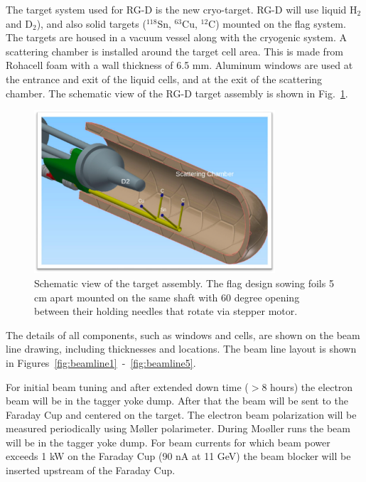 \documentclass[11pt]{article}
\begin{document}
The target system used for RG-D is the new cryo-target.  RG-D will use liquid H$_2$ and D$_2$), and also solid targets ($^{118}$Sn, $^{63}$Cu, $^{12}$C) mounted on the flag system. The targets are housed in a vacuum vessel along with the cryogenic system.  A scattering chamber is installed around the target cell area.  This is made from Rohacell foam with a wall thickness of 6.5 mm.  Aluminum windows are used at the entrance and exit of the liquid cells, and at the exit of the scattering chamber. The schematic view of the RG-D target assembly is shown in Fig.~\ref{fig:RGDT}. 

\begin{figure}[htb!]
\centering
\includegraphics[width=0.8\textwidth]{RGDtarget.png}
\caption{Schematic view of the target assembly.
The flag design sowing foils 5 cm apart mounted on the same shaft with 60 degree opening between their holding needles that rotate via stepper motor.}
\label{fig:RGDT}
\end{figure}


The details of all components, such as windows and cells, are shown on the beam line drawing, including thicknesses and locations.  The beam line layout is shown in Figures~\ref{fig:beamline1}~-~\ref{fig:beamline5}.



For initial beam tuning and after extended down time ($>$8 hours) the electron beam will be  in the tagger yoke dump. After that the beam will be sent to the Faraday Cup and centered on the target.  The electron beam polarization will be measured periodically using M{\o}ller polarimeter. During Mo{\o}ller runs the beam will be in the tagger yoke dump. For beam currents for which beam power exceeds 1 kW on the Faraday Cup (90 nA at 11 GeV) the beam blocker will be inserted upstream of the Faraday Cup.
\end{document}
